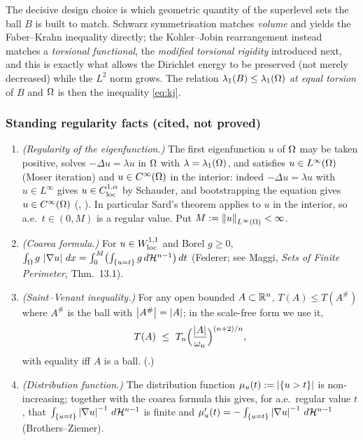 The decisive design choice is which geometric quantity of the superlevel
sets the ball $B$ is built to match. Schwarz symmetrisation matches
\emph{volume} and yields the Faber--Krahn inequality directly; the
Kohler--Jobin rearrangement instead matches a \emph{torsional functional},
the \emph{modified torsional rigidity} introduced next, and this is exactly
what allows the Dirichlet energy to be preserved (not merely decreased)
while the $L^2$ norm grows. The relation $\lambda_1(B)\le\lambda_1(\Omega)$
\emph{at equal torsion} of $B$ and $\Omega$ is then the inequality
\eqref{eq:kj}.

\subsubsection*{Standing regularity facts (cited, not proved)}
\begin{enumerate}[label=\textup{(R\arabic*)}]
\item\label{R:reg} \emph{(Regularity of the eigenfunction.)} The first
eigenfunction $u$ of $\Omega$ may be taken positive, solves
$-\Delta u=\lambda u$ in $\Omega$ with $\lambda=\lambda_1(\Omega)$, and satisfies
$u\in L^\infty(\Omega)$ (Moser iteration) and $u\in C^\infty(\Omega)$ in the
interior: indeed $-\Delta u=\lambda u$ with $u\in L^\infty$ gives $u\in
C^{1,\alpha}_{\rm loc}$ by Schauder, and bootstrapping the equation gives
$u\in C^\infty(\Omega)$ (\cite[Prop.~2.4]{Brasco2014}, \cite{GilbargTrudinger2001}).
In particular Sard's theorem applies to $u$ in the interior, so a.e.\
$t\in(0,M)$ is a regular value. Put $M:=\left\|u\right\|_{L^\infty(\Omega)}<\infty$.
\item\label{R:coarea} \emph{(Coarea formula.)} For $u\in W^{1,1}_{\rm loc}$
and Borel $g\ge0$,
$\int_\Omega g\,\left|\nabla u\right|\,dx=\int_0^M\bigl(\int_{\{u=t\}}g\,d\mathcal H^{n-1}\bigr)\,dt$
(Federer; see Maggi, \emph{Sets of Finite Perimeter}, Thm.~13.1).
\item\label{R:saint-venant} \emph{(Saint--Venant inequality.)} For any open
bounded $A\subset\mathbb R^n$, $T(A)\le T(A^\#)$ where $A^\#$ is the ball with
$\left|A^\#\right|=\left|A\right|$; in the scale-free form we use it,
\begin{equation}\label{eq:sv-scale}
  T(A)\ \le\ T_n\Bigl(\frac{\left|A\right|}{\omega_n}\Bigr)^{(n+2)/n},
\end{equation}
with equality iff $A$ is a ball. (\cite[(1.7) with $p=2$]{Brasco2014}.)
\item\label{R:absc} \emph{(Distribution function.)} The distribution
function $\mu_u(t):=\left|\{u>t\}\right|$ is non-increasing; together with the
coarea formula this gives, for a.e.\ regular value $t$, that
$\int_{\{u=t\}}\left|\nabla u\right|^{-1}\,d\mathcal H^{n-1}$ is finite and
$\mu_u'(t)=-\int_{\{u=t\}}\left|\nabla u\right|^{-1}\,d\mathcal H^{n-1}$ (Brothers--Ziemer).
\end{enumerate}

